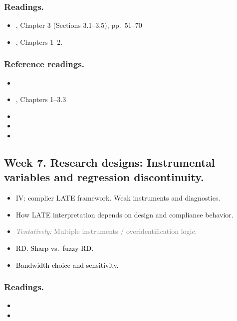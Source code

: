 \documentclass[letterpaper, 12pt, parskip=full,DIV=10]{scrartcl}
\begin{document}
\subsubsection*{Readings.}
\begin{itemize}
\item {}, Chapter 3 (Sections 3.1--3.5), pp.\ 51--70
\item {}, Chapters 1--2. 
\end{itemize}

\subsubsection*{Reference readings.}
\begin{itemize}
\item {}
\item {}, Chapters 1--3.3
\item {}
\item {}
\item {}
\end{itemize}

\subsection*{Week 7. Research designs: Instrumental variables and regression discontinuity.}
\begin{itemize}
\item IV: complier LATE framework. Weak instruments and diagnostics.
\item How LATE interpretation depends on design and compliance behavior.
\item \textcolor{gray}{\textit{Tentatively:} Multiple instruments / overidentification logic.}
\item \textcolor{black}{RD. Sharp vs.\ fuzzy RD.}
\item \textcolor{black}{Bandwidth choice and sensitivity.}
\end{itemize}

\subsubsection*{Readings.}
\begin{itemize}
\item {}
\item {}
\end{itemize}
\end{document}

